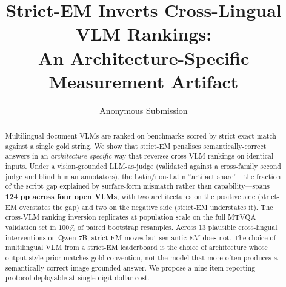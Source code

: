 \documentclass[11pt]{article}
\title{Strict-EM Inverts Cross-Lingual VLM Rankings:\\An Architecture-Specific Measurement Artifact}
\author{Anonymous Submission}
\begin{document}
\maketitle

\begin{abstract}
Multilingual document VLMs are ranked on benchmarks scored by strict exact match against a single gold string. We show that strict-EM penalises semantically-correct answers in an \emph{architecture-specific} way that reverses cross-VLM rankings on identical inputs. Under a vision-grounded LLM-as-judge (validated against a cross-family second judge and blind human annotators), the Latin/non-Latin ``artifact share''---the fraction of the script gap explained by surface-form mismatch rather than capability---spans \textbf{124 pp across four open VLMs}, with two architectures on the positive side (strict-EM overstates the gap) and two on the negative side (strict-EM understates it). The cross-VLM ranking inversion replicates at population scale on the full MTVQA validation set in $100\%$ of paired bootstrap resamples. Across 13 plausible cross-lingual interventions on Qwen-7B, strict-EM moves but semantic-EM does not. The choice of multilingual VLM from a strict-EM leaderboard is the choice of architecture whose output-style prior matches gold convention, not the model that more often produces a semantically correct image-grounded answer. We propose a nine-item reporting protocol deployable at single-digit dollar cost.
\end{abstract}















\appendix

\end{document}
